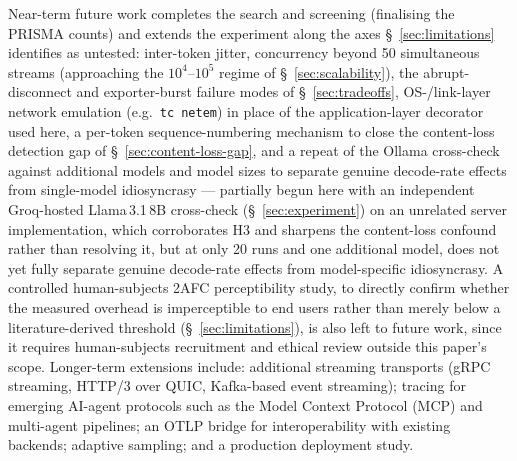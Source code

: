 \documentclass[11pt]{article}
\begin{document}
Near-term future work completes the search and screening (finalising the PRISMA counts) and extends the experiment along the axes \S~\ref{sec:limitations} identifies as untested: inter-token jitter, concurrency beyond 50 simultaneous streams (approaching the $10^4$--$10^5$ regime of \S~\ref{sec:scalability}), the abrupt-disconnect and exporter-burst failure modes of \S~\ref{sec:tradeoffs}, OS-/link-layer network emulation (e.g.\ \texttt{tc netem}) in place of the application-layer decorator used here, a per-token sequence-numbering mechanism to close the content-loss detection gap of \S~\ref{sec:content-loss-gap}, and a repeat of the Ollama cross-check against additional models and model sizes to separate genuine decode-rate effects from single-model idiosyncrasy --- partially begun here with an independent Groq-hosted Llama\,3.1\,8B cross-check (\S~\ref{sec:experiment}) on an unrelated server implementation, which corroborates H3 and sharpens the content-loss confound rather than resolving it, but at only 20 runs and one additional model, does not yet fully separate genuine decode-rate effects from model-specific idiosyncrasy. A controlled human-subjects 2AFC perceptibility study, to directly confirm whether the measured overhead is imperceptible to end users rather than merely below a literature-derived threshold (\S~\ref{sec:limitations}), is also left to future work, since it requires human-subjects recruitment and ethical review outside this paper's scope. Longer-term extensions include: additional streaming transports (gRPC streaming, HTTP/3 over QUIC, Kafka-based event streaming); tracing for emerging AI-agent protocols such as the Model Context Protocol (MCP) and multi-agent pipelines; an OTLP bridge for interoperability with existing backends; adaptive sampling; and a production deployment study.
\end{document}
